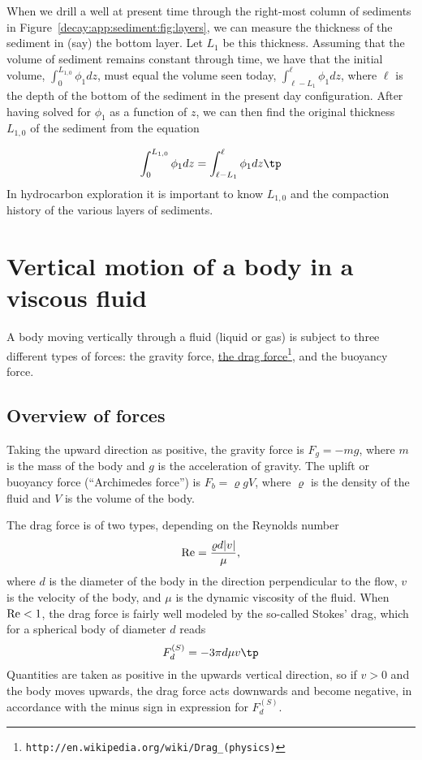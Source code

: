 \documentclass[graybox,sectrefs,envcountresetchap,open=right,final]{svmonodo}
\begin{document}
When we drill a well at present time through the right-most column of
sediments in Figure~\ref{decay:app:sediment:fig:layers}, we can measure
the thickness of the sediment in (say) the bottom layer. Let $L_1$ be
this thickness.  Assuming that the volume of sediment remains constant
through time, we have that the initial volume, $\int_0^{L_{1,0}}
\phi_1 dz$, must equal the volume seen today,
$\int_{\ell-L_1}^{\ell}\phi_1 dz$, where $\ell$ is the depth of the
bottom of the sediment in the present day configuration.  After having
solved for $\phi_1$ as a function of $z$, we can then find the
original thickness $L_{1,0}$ of the sediment from the equation

\[ \int_0^{L_{1,0}} \phi_1 dz = \int_{\ell-L_1}^{\ell}\phi_1 dz \tp \]
In hydrocarbon exploration it is important to know $L_{1,0}$ and the
compaction history of the various layers of sediments.

\section{Vertical motion of a body in a viscous fluid}
\label{decay:app:drag}

A body moving vertically through a fluid (liquid or gas) is subject to
three different types of forces: the gravity force, \href{{http://en.wikipedia.org/wiki/Drag_(physics)}}{the drag force}\footnote{\texttt{http://en.wikipedia.org/wiki/Drag\_(physics)}},
and the buoyancy force.

\subsection{Overview of forces}

Taking the upward direction as positive,
the gravity force is $F_g= -mg$, where $m$ is the mass of the body and
$g$ is the acceleration of gravity.
The uplift or buoyancy force (``Archimedes force'') is $F_b = \varrho gV$,
where $\varrho$ is the density of the fluid and
$V$ is the volume of the body.

The drag force is of two types, depending on the Reynolds number
\begin{equation}
\hbox{Re} = \frac{\varrho d|v|}{\mu},
\end{equation}
where $d$ is the diameter of the body in
the direction perpendicular to the flow, $v$ is the velocity of the
body, and $\mu$ is the dynamic viscosity of the fluid.
When $\hbox{Re} < 1$, the drag force is fairly well modeled by
the so-called Stokes' drag,
which for a spherical body of diameter $d$ reads
\begin{equation}
F_d^{(S)} = - 3\pi d\mu v
\tp
\end{equation}
Quantities are taken as positive in the upwards vertical direction, so
if $v>0$ and the body moves upwards, the drag force acts downwards and
become negative, in accordance with the minus sign in expression for
$F_d^{(S)}$.
\end{document}
